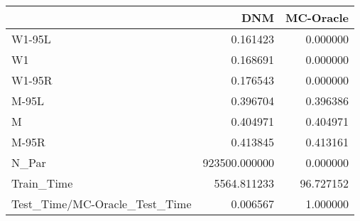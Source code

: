 \begin{tabular}{lrr}
\toprule
{} &            DNM &  MC-Oracle \\
\midrule
W1-95L                        &       0.161423 &   0.000000 \\
W1                            &       0.168691 &   0.000000 \\
W1-95R                        &       0.176543 &   0.000000 \\
M-95L                         &       0.396704 &   0.396386 \\
M                             &       0.404971 &   0.404971 \\
M-95R                         &       0.413845 &   0.413161 \\
N\_Par                         &  923500.000000 &   0.000000 \\
Train\_Time                    &    5564.811233 &  96.727152 \\
Test\_Time/MC-Oracle\_Test\_Time &       0.006567 &   1.000000 \\
\bottomrule
\end{tabular}
